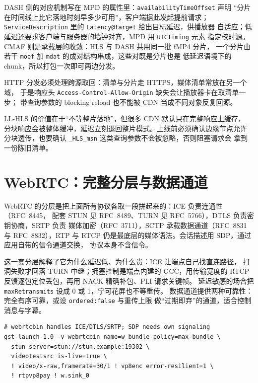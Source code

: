 \documentclass[12pt,a4paper,fontset=fandol]{ctexbook}
\newcommand{\Tp}[1]{\texttt{#1}}
\begin{document}
DASH 侧的对应机制写在 MPD 的属性里：\Tp{availabilityTimeOffset} 声明
``分片在时间线上比它落地时刻早多少可用''，客户端据此发起提前请求；
\Tp{ServiceDescription} 里的 \Tp{Latency@target} 给出目标延迟，供播放器
自适应；低延迟还要求客户端与服务器的墙钟对齐，MPD 用 \Tp{UTCTiming} 元素
指定校时源。CMAF 则是承载层的收敛：HLS 与 DASH 共用同一批 fMP4 分片，
一个分片由若干 \Tp{moof} 加 \Tp{mdat} 的成对结构串成，这些对既是分片也是
低延迟语境下的 chunk，所以打包一次即可两边分发。

HTTP 分发必须处理跨源取回：清单与分片走 HTTPS，媒体清单常放在另一个域，
于是响应头 \Tp{Access-Control-Allow-Origin} 缺失会让播放器卡在取清单一步；
带查询参数的 blocking reload 也不能被 CDN 当成不同对象反复回源。

\begin{note}[title={CDN 与低延迟分片缓存并不总是相容}]
LL-HLS 的价值在于``不等整片落地''，但很多 CDN 默认只在完整响应上缓存，
分块响应会被整体缓冲，延迟立刻退回整片模式。上线前必须确认边缘节点允许
分块透传，也要确认 \Tp{\_HLS\_msn} 这类查询参数不会被忽略，否则阻塞请求会
拿到一份陈旧清单。
\end{note}

\section{WebRTC：完整分层与数据通道}

WebRTC 的分层是把上面所有协议各取一段拼起来的：ICE 负责连通性（RFC~8445，
配套 STUN 见 RFC~8489、TURN 见 RFC~5766），DTLS 负责密钥协商，SRTP 负责
媒体加密（RFC~3711），SCTP 承载数据通道（RFC~8831 与 RFC~8832），RTP 与
RTCP 仍是最底层的媒体语法。会话描述用 SDP，通过应用自带的信令通道交换，
协议本身不含信令。

这一套分层解释了它为什么延迟低、为什么贵：ICE 让端点自己找直连路径，
打洞失败才回落 TURN 中继；拥塞控制是端点内建的 GCC，用传输宽度的 RTCP
反馈逐包定位丢包，再用 NACK 精确补包、PLI 请求关键帧。
延迟敏感的场合把 \Tp{maxRetransmits} 设成 0 或 1，宁可花屏也不等重传。
数据通道提供两种可靠性：完全有序可靠，或设 \Tp{ordered:false} 与重传上限
做``过期即弃''的通道，适合控制消息与字幕。

\begin{lstlisting}[style=shellstyle,caption={GStreamer 经 webrtcbin 组一条连麦推流},label={lst:ch11-webrtcbin}]
# webrtcbin handles ICE/DTLS/SRTP; SDP needs own signaling
gst-launch-1.0 -v webrtcbin name=w bundle-policy=max-bundle \
  stun-server=stun://stun.example:19302 \
  videotestsrc is-live=true \
  ! video/x-raw,framerate=30/1 ! vp8enc error-resilient=1 \
  ! rtpvp8pay ! w.sink_0
\end{lstlisting}
\end{document}
